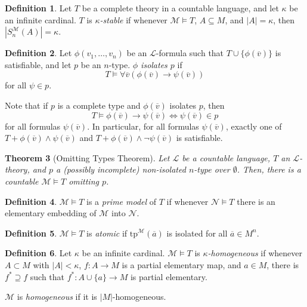 \documentclass{amsart}
\newtheorem{theorem}{Theorem}[subsection]
\theoremstyle{definition}
\newtheorem{definition}[theorem]{Definition}
\numberwithin{equation}{section}
\begin{document}
\begin{definition}
  Let $T$ be a complete theory in a countable language,
  and let $\kappa$ be an infinite cardinal.
  $T$ is \emph{$\kappa$-stable} if whenever $\mathcal{M}\models T$,
  $A \subseteq M$, and $|A| = \kappa$, then $|S^{\mathcal{M}}_n(A)| = \kappa$.
\end{definition}

\begin{definition}
  Let $\phi(v_1,\dots,v_n)$ be an $\mathcal{L}$-formula such that $T \cup \{\phi(\overline{v})\}$ is satisfiable,
  and let $p$ be an $n$-type.
  \emph{$\phi$ isolates $p$} if
  \[
    T \models \forall\overline{v}(\phi(\overline{v}) \to \psi(\overline{v}))
  \]
  for all $\psi \in p$.
\end{definition}
Note that if $p$ is a complete type and $\phi(\overline{v})$ isolates $p$, then
\[
  T \models \phi(\overline{v}) \to \psi(\overline{{v}}) \iff \psi(\overline{v})\in p
\]
for all formulas $\psi(\overline{v})$.
In particular, for all formulas $\psi(\overline{v})$,
exactly one of $T + \phi(\overline{v}) \land \psi(\overline{v})$ and $T + \phi(\overline{v}) \land \neg\psi(\overline{v})$ is satisfiable.

\begin{theorem}[Omitting Types Theorem]
  Let $\mathcal{L}$ be a countable language,
  $T$ an $\mathcal{L}$-theory,
  and $p$ a (possibly incomplete) non-isolated $n$-type over $\emptyset$.
  Then, there is a countable $\mathcal{M} \models T$ omitting $p$.
\end{theorem}

\begin{definition}
  $\mathcal{M}\models T$ is a \emph{prime model} of $T$ if whenever $\mathcal{N}\models T$ there is an elementary embedding of $\mathcal{M}$ into $\mathcal{N}$.
\end{definition}

\begin{definition}
  $\mathcal{M}\models T$ is \emph{atomic} if $\mathrm{tp}^{\mathcal{M}}(\overline{a})$ is isolated for all $\overline{a} \in M^n$.
\end{definition}

\begin{definition}
  Let $\kappa$ be an infinite cardinal.
  $\mathcal{M}\models T$ is \emph{$\kappa$-homogeneous}
  if whenever $A \subset M$ with $|A| < \kappa$,
  $f: A \to M$ is a partial elementary map,
  and $a \in M$, there is $f^*\supseteq f$ such that $f^*: A\cup \{a\} \to M$ is partial elementary.

  $\mathcal{M}$ is \emph{homogeneous} if it is $|M|$-homogeneous.
\end{definition}
\end{document}
